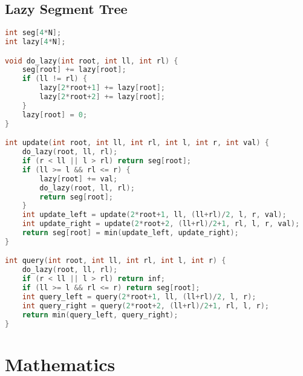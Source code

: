 \documentclass{article}
\begin{document}
\subsection{Lazy Segment Tree}
\begin{lstlisting}[language=C++]
int seg[4*N];
int lazy[4*N];

void do_lazy(int root, int ll, int rl) {
	seg[root] += lazy[root];
	if (ll != rl) {
		lazy[2*root+1] += lazy[root];
		lazy[2*root+2] += lazy[root];
	}
	lazy[root] = 0;
}

int update(int root, int ll, int rl, int l, int r, int val) {
	do_lazy(root, ll, rl);
	if (r < ll || l > rl) return seg[root];
	if (ll >= l && rl <= r) {
		lazy[root] += val;
		do_lazy(root, ll, rl);
		return seg[root];
	}
	int update_left = update(2*root+1, ll, (ll+rl)/2, l, r, val);
	int update_right = update(2*root+2, (ll+rl)/2+1, rl, l, r, val);
	return seg[root] = min(update_left, update_right);
}

int query(int root, int ll, int rl, int l, int r) {
	do_lazy(root, ll, rl);
	if (r < ll || l > rl) return inf;
	if (ll >= l && rl <= r) return seg[root];
	int query_left = query(2*root+1, ll, (ll+rl)/2, l, r);
	int query_right = query(2*root+2, (ll+rl)/2+1, rl, l, r);
	return min(query_left, query_right); 
}
\end{lstlisting}
\section{Mathematics}
\end{document}
